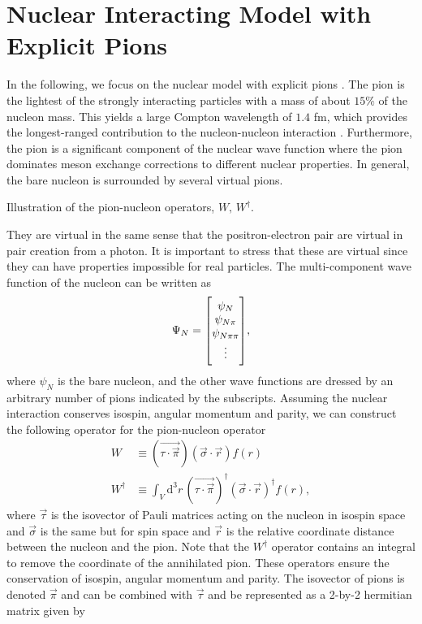 \section{Nuclear Interacting Model with Explicit Pions }\label{sec:model}
In the following, we focus on the nuclear model with explicit pions \cite{Fedorov2020}. The pion is the lightest of the strongly interacting particles with a mass of about $15\%$ of the nucleon mass. This yields a large Compton wavelength of $1.4$ fm, which provides the longest-ranged contribution to the nucleon-nucleon interaction \cite{PionBib}. Furthermore, the pion is a significant component of the nuclear wave function where the pion dominates meson exchange corrections to different nuclear properties. In general, the bare nucleon is surrounded by several virtual pions. 
\begin{marginfigure}
	\centering
	
	\caption{Illustration of the pion-nucleon operators, $W, \, W^\dagger$.}
	\label{fig:superposition}
\end{marginfigure}
They are virtual in the same sense that the positron-electron pair are virtual in pair creation from a photon. It is important to stress that these are virtual since they can have properties impossible for real particles. The multi-component wave function of the nucleon can be written as
\begin{equation} \label{superposition}
	\Psi_N = \mqty[\psi_{N} \\
	\psi_{N\pi} \\
	\psi_{N\pi\pi}\\
	\vdots],
\end{equation}
where $\psi_{N}$ is the bare nucleon, and the other wave functions are dressed by an arbitrary number of pions indicated by the subscripts. Assuming the nuclear interaction conserves isospin, angular momentum and parity, we can construct the following operator for the pion-nucleon operator \cite{AkselBook}
\begin{align} \label{W}
	W & \equiv (\vec{\tau\cdot\vec{\pi}})(\vec{\sigma}\cdot\vec{r})f(r) \\
	W^\dagger & \equiv  \int_V \text{d}^3 r \, (\vec{\tau\cdot\vec{\pi}})^\dagger (\vec{\sigma}\cdot\vec{r})^\dagger f(r) \label{Wdagger},
\end{align}
where $\vec{\tau}$ is the isovector of Pauli matrices acting on the nucleon in isospin space and $\vec{\sigma}$ is the same but for spin space and $\vec{r}$ is the relative coordinate distance between the nucleon and the pion. Note that the $W^\dagger$ operator contains an integral to remove the coordinate of the annihilated pion. These operators ensure the conservation of isospin, angular momentum and parity. The isovector of pions is denoted $\vec{\pi}$ and can be combined with $\vec{\tau}$ and be represented as a 2-by-2 hermitian matrix \cite{ZeeGroup} given by 
